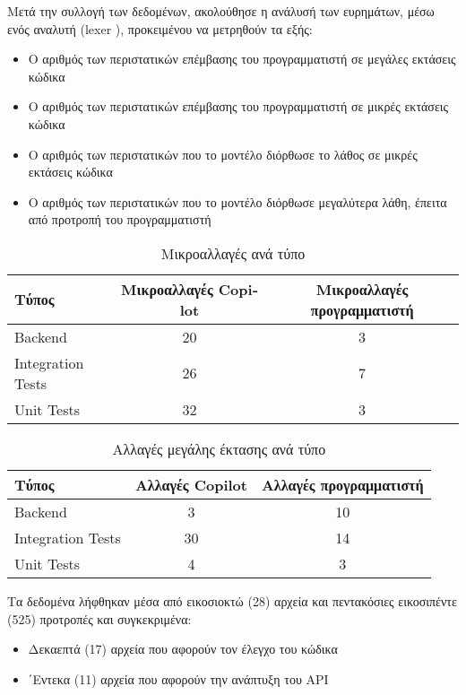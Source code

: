 Μετά την συλλογή των δεδομένων, ακολούθησε η ανάλυσή των ευρημάτων, μέσω
ενός αναλυτή (\textlatin{lexer} \cite{ball2018}), προκειμένου να
μετρηθούν τα εξής:

\begin{itemize}
\item
  O αριθμός των περιστατικών επέμβασης του προγραμματιστή σε μεγάλες
  εκτάσεις κώδικα
\item
  Ο αριθμός των περιστατικών επέμβασης του προγραμματιστή σε μικρές
  εκτάσεις κώδικα
\item
  Ο αριθμός των περιστατικών που το μοντέλο διόρθωσε το λάθος σε μικρές
  εκτάσεις κώδικα
\item
  Ο αριθμός των περιστατικών που το μοντέλο διόρθωσε μεγαλύτερα λάθη,
  έπειτα από προτροπή του προγραμματιστή
\end{itemize}

\begin{table}[h]
  \centering
  \begin{tabular}{lcc}
    \hline
    \textbf{Τύπος} & \textbf{Μικροαλλαγές \textlatin{Copilot}} & \textbf{Μικροαλλαγές προγραμματιστή} \\ \hline
    \textlatin{Backend} & 20 & 3 \\
    \textlatin{Integration Tests} & 26 & 7 \\
    \textlatin{Unit Tests} & 32 & 3 \\ \hline
  \end{tabular}
  \caption{Μικροαλλαγές ανά τύπο}
  \label{table:microchanges_by_subject}
\end{table}

\begin{table}[h]
  \centering
  \begin{tabular}{lcc}
    \hline
    \textbf{Τύπος} & \textbf{Αλλαγές \textlatin{Copilot}} & \textbf{Αλλαγές προγραμματιστή} \\ \hline
    \textlatin{Backend} & 3 & 10 \\
    \textlatin{Integration Tests} & 30 & 14 \\
    \textlatin{Unit Tests} & 4 & 3 \\ \hline
  \end{tabular}
  \caption{Αλλαγές μεγάλης έκτασης ανά τύπο}
  \label{table:major_changes_by_subject}
\end{table}

Τα δεδομένα λήφθηκαν μέσα από εικοσιοκτώ (28) αρχεία και πεντακόσιες
εικοσιπέντε (525) προτροπές και συγκεκριμένα:
\begin{itemize}
\item
  Δεκαεπτά (17) αρχεία που αφορούν τον έλεγχο του κώδικα
\item
  ΄Εντεκα (11) αρχεία που αφορούν την ανάπτυξη του \textlatin{API}
\end{itemize}


